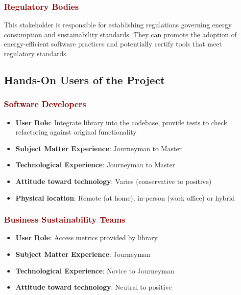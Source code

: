 \documentclass[12pt]{article}
\begin{document}
\subsubsection*{\textcolor{Maroon}{Regulatory Bodies}}
This stakeholder is responsible for establishing regulations
governing energy consumption and sustainability standards. They can
promote the adoption of energy-efficient software practices and
potentially certify tools that meet regulatory standards.

\subsection{Hands-On Users of the Project}
\subsubsection*{\textcolor{Maroon}{Software Developers}}
\begin{itemize}
  \item \textbf{User Role}: Integrate library into the codebase,
    provide tests to check refactoring against original functionality

  \item \textbf{Subject Matter Experience}: Journeyman to Master

  \item \textbf{Technological Experience}: Journeyman to Master

  \item \textbf{Attitude toward technology}: Varies (conservative to positive)

  \item \textbf{Physical location}: Remote (at home), in-person (work
    office) or hybrid
\end{itemize}

\subsubsection*{\textcolor{Maroon}{Business Sustainability Teams}}
\begin{itemize}
  \item \textbf{User Role}: Access metrics provided by library

  \item \textbf{Subject Matter Experience}: Journeyman

  \item \textbf{Technological Experience}: Novice to Journeyman

  \item \textbf{Attitude toward technology}: Neutral to positive

\end{itemize}
\end{document}
